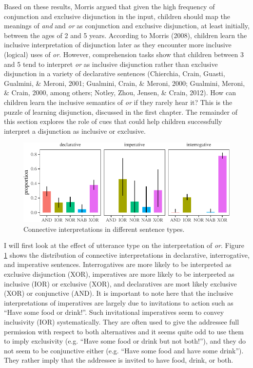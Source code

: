 \documentclass[floatsintext,man]{apa6}
\theoremstyle{definition}
\theoremstyle{definition}
\theoremstyle{definition}
\theoremstyle{remark}
\begin{document}
Based on these results, Morris argued that given the high frequency of
conjunction and exclusive disjunction in the input, children should map
the meanings of \emph{and} and \emph{or} as conjunction and exclusive
disjunction, at least initially, between the ages of 2 and 5 years.
According to Morris (2008), children learn the inclusive interpretation
of disjunction later as they encounter more inclusive (logical) uses of
\emph{or}. However, comprehension tasks show that children between 3 and
5 tend to interpret \emph{or} as inclusive disjunction rather than
exclusive disjunction in a variety of declarative sentences (Chierchia,
Crain, Guasti, Gualmini, \& Meroni, 2001; Gualmini, Crain, \& Meroni,
2000; Gualmini, Meroni, \& Crain, 2000, among others; Notley, Zhou,
Jensen, \& Crain, 2012). How can children learn the inclusive semantics
of \emph{or} if they rarely hear it? This is the puzzle of learning
disjunction, discussed in the first chapter. The remainder of this
section explores the role of cues that could help children successfully
interpret a disjunction as inclusive or exclusive.

\begin{figure}[tb]

{\centering \includegraphics{figs/utterancetypePlot-1} 

}

\caption{Connective interpretations in different sentence types.}\label{fig:utterancetypePlot}
\end{figure}

I will first look at the effect of utterance type on the interpretation
of \emph{or}. Figure \ref{fig:utterancetypePlot} shows the distribution
of connective interpretations in declarative, interrogative, and
imperative sentences. Interrogatives are more likely to be interpreted
as exclusive disjunction (XOR), imperatives are more likely to be
interpreted as inclusive (IOR) or exclusive (XOR), and declaratives are
most likely exclusive (XOR) or conjunctive (AND). It is important to
note here that the inclusive interpretations of imperatives are largely
due to invitations to action such as \enquote{Have some food or drink!}.
Such invitational imperatives seem to convey inclusivity (IOR)
systematically. They are often used to give the addressee full
permission with respect to both alternatives and it seems quite odd to
use them to imply exclusivity (e.g. \enquote{Have some food or drink but
not both!}), and they do not seem to be conjunctive either (e.g.
\enquote{Have some food and have some drink}). They rather imply that
the addressee is invited to have food, drink, or both.
\end{document}

